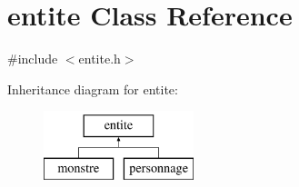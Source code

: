 \hypertarget{classentite}{}\section{entite Class Reference}
\label{classentite}


{\ttfamily \#include $<$entite.\+h$>$}

Inheritance diagram for entite\+:\begin{figure}[H]
\begin{center}
\leavevmode
\includegraphics[height=2.000000cm]{classentite}
\end{center}
\end{figure}
